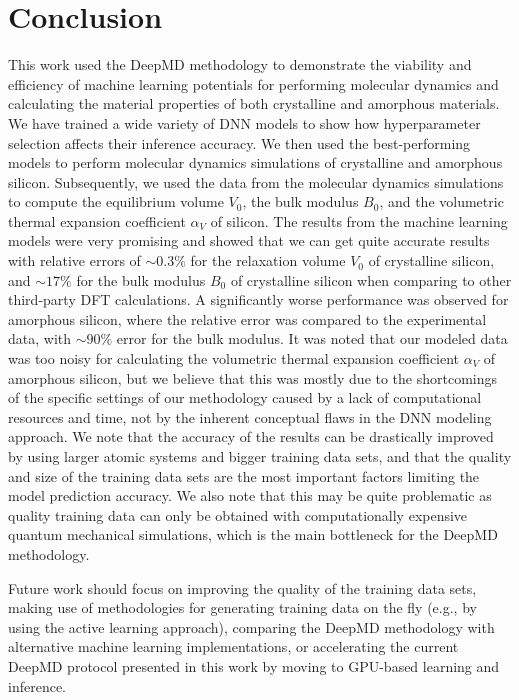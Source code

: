 \chapter{Conclusion}

This work used the DeepMD methodology to demonstrate the viability and
efficiency of machine learning potentials for performing molecular dynamics
and calculating the material properties of both crystalline and amorphous
materials. We have trained a wide variety of DNN models to show how
hyperparameter selection affects their inference accuracy. We then used the
best-performing models to perform molecular dynamics simulations of crystalline and amorphous silicon. Subsequently, we
used the data from the molecular dynamics simulations to compute the
equilibrium volume $V_0$, the bulk modulus $B_0$, and the volumetric thermal
expansion coefficient $\alpha_V$ of silicon. The results from the machine
learning models were very promising and showed that we can get quite accurate
results with relative errors of $\sim 0.3\%$ for the relaxation volume $V_0$
of crystalline silicon, and $\sim 17 \%$ for the bulk modulus $B_0$ of crystalline
silicon when comparing to other third-party DFT calculations. A significantly
worse performance was observed for amorphous silicon, where the relative error
was compared to the experimental data, with $\sim 90 \%$ error for the bulk modulus.
It was noted that our modeled data was too noisy for calculating the volumetric
thermal expansion coefficient $\alpha_V$ of amorphous silicon, but we believe that this
was mostly due to the shortcomings of the specific settings of our methodology
caused by a lack of computational resources and time, not by the inherent conceptual flaws in
the DNN modeling approach. We note that the accuracy of the results can be
drastically improved by using larger atomic systems and bigger training data sets,
and that the quality and size of the training data sets are the most important factors limiting the
model prediction accuracy. We also note that this may be quite problematic as
quality training data can only be obtained with computationally expensive
quantum mechanical simulations, which is the main bottleneck for the DeepMD
methodology.

Future work should focus on improving the quality of the training data sets,
making use of methodologies for generating training data on the fly (e.g., by
using the active learning approach), comparing the DeepMD methodology with
alternative machine learning implementations, or accelerating the current DeepMD
protocol presented in this work by moving to GPU-based learning and inference.
